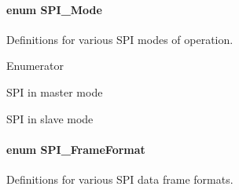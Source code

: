 \paragraph[{S\+P\+I\+\_\+\+Mode}]{\setlength{\rightskip}{0pt plus 5cm}enum {\bf S\+P\+I\+\_\+\+Mode}}\label{_s_p_i_8h_a60a7e3d74577b38aa79ea6983362f942}


Definitions for various S\+P\+I modes of operation. 

\begin{Desc}
\item[Enumerator]\par
\begin{description}
\item[{\em 
S\+P\+I\+\_\+\+M\+A\+S\+T\+E\+R\label{_s_p_i_8h_a60a7e3d74577b38aa79ea6983362f942a84379dc90398ca075038c8d5ee465f6a}
}]S\+P\+I in master mode \item[{\em 
S\+P\+I\+\_\+\+S\+L\+A\+V\+E\label{_s_p_i_8h_a60a7e3d74577b38aa79ea6983362f942abc98c1546fe12d3fceb1f86cf670faa9}
}]S\+P\+I in slave mode \end{description}
\end{Desc}
\paragraph[{S\+P\+I\+\_\+\+Frame\+Format}]{\setlength{\rightskip}{0pt plus 5cm}enum {\bf S\+P\+I\+\_\+\+Frame\+Format}}\label{_s_p_i_8h_a4e1f33555dfa8147205af5b266f3a489}


Definitions for various S\+P\+I data frame formats. 


